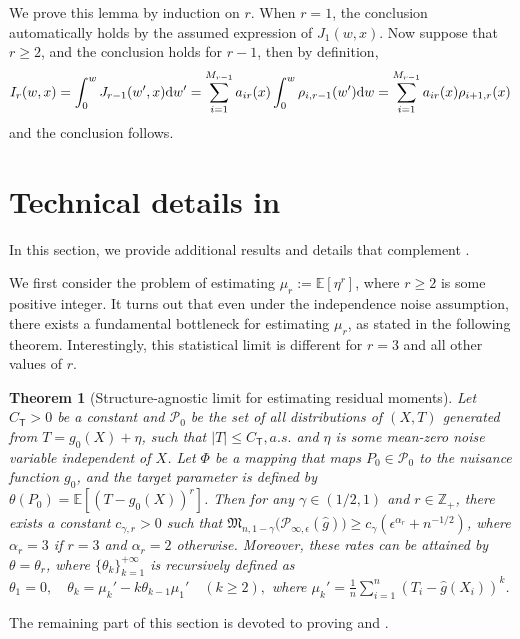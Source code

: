 \documentclass{article}
\def\eps{{\epsilon}}
\def\gP{{\mathcal{P}}}
\newcommand{\E}{\mathbb{E}}
\newcommand{\dd}{\textup{d}}
\newtheorem{theorem}{Theorem}[section]
\begin{document}
We prove this lemma by induction on $r$. When $r=1$, the conclusion automatically holds by the assumed expression of $J_1(w,x)$. Now suppose that $r\geq 2$, and the conclusion holds for $r-1$, then by definition,
$$I_{r}(w,x) = \int_0^w J_{r-1}(w',x)\dd w' = \sum_{i=1}^{M_{r-1}}a_{ir}(x)\int_0^w \rho_{i,r-1}(w')\dd w = \sum_{i=1}^{M_{r-1}}a_{ir}(x)\rho_{i+1,r}(x)$$
and the conclusion follows.




\section{Technical details in }

In this section, we provide additional results and details that complement .

We first consider the problem of estimating $\mu_r := \E[\eta^r]$, where $r\geq 2$ is some positive integer. It turns out that even under the independence noise assumption, there exists a fundamental bottleneck for estimating $\mu_r$, as stated in the following theorem. Interestingly, this statistical limit is different for $r=3$ and all other values of $r$.

\begin{theorem}[Structure-agnostic limit for estimating residual moments]
    \label{thm:residual-moment-estimate-informal}
    Let $C_{\mathsf{T}}>0$ be a constant and $\gP_0$ be the set of all distributions of $(X,T)$ generated from $T=g_0(X)+\eta$, such that $|T|\leq C_{\mathsf{T}}, a.s.$ and $\eta$ is some mean-zero noise variable independent of $X$. Let $\Phi$ be a mapping that maps $P_0\in\gP_0$ to the nuisance function $g_0$, and the target parameter is defined by $\theta(P_0)=\E[(T-g_0(X))^r]$. Then for any $\gamma\in(1/2,1)$ and $r\in\mathbb{Z}_+$, there exists a constant $c_{\gamma,r}>0$ such that $\mathfrak{M}_{n,1-\gamma}\big(\gP_{\infty,\eps}(\hat{g})\big) \geq c_{\gamma} \left(\eps^{\alpha_r} + n^{-1/2}\right)$, where $\alpha_r=3$ if $r=3$ and $\alpha_r=2$ otherwise.
    Moreover, these rates can be attained by $\theta = \theta_r$, where $\{\theta_k\}_{k=1}^{+\infty}$ is recursively defined as $\theta_1 = 0,\quad \theta_k = \mu_k' - k \theta_{k-1} \mu_1' \quad (k\geq 2),$ where $\mu_k' = \frac{1}{n}\sum_{i=1}^n \left(T_i-\hat{g}(X_i)\right)^k$.
\end{theorem}


The remaining part of this section is devoted to proving  and .
\end{document}
